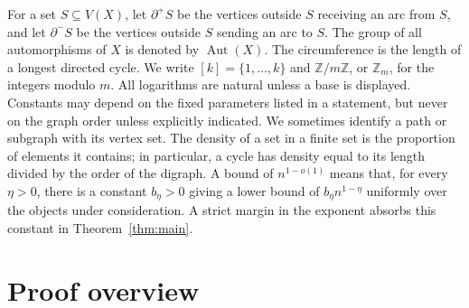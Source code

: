\documentclass[11pt,a4paper,reqno]{amsart}
\theoremstyle{definition}
\theoremstyle{remark}
\numberwithin{equation}{section}
\DeclareMathOperator{\Aut}{Aut}
\newcommand{\Z}{\mathbb Z}
\begin{document}
For a set $S\subseteq V(X)$, let $\partial^+S$ be the vertices outside $S$ receiving an arc from $S$, and let $\partial^-S$ be the vertices outside $S$ sending an arc to $S$. The group of all automorphisms of $X$ is denoted by $\Aut(X)$. The circumference is the length of a longest directed cycle. We write $[k]=\{1,\ldots,k\}$ and $\Z/m\Z$, or $\Z_m$, for the integers modulo $m$. All logarithms are natural unless a base is displayed. Constants may depend on the fixed parameters listed in a statement, but never on the graph order unless explicitly indicated. We sometimes identify a path or subgraph with its vertex set. The density of a set in a finite set is the proportion of elements it contains; in particular, a cycle has density equal to its length divided by the order of the digraph. A bound of $n^{1-o(1)}$ means that, for every $\eta>0$, there is a constant $b_\eta>0$ giving a lower bound of $b_\eta n^{1-\eta}$ uniformly over the objects under consideration. A strict margin in the exponent absorbs this constant in Theorem~\ref{thm:main}.


\section{Proof overview}\label{sec:overview}
\end{document}
